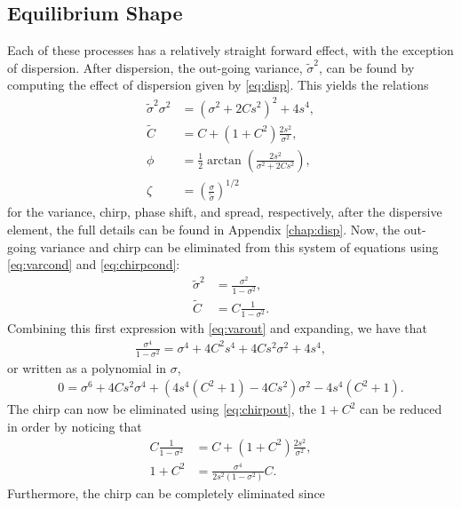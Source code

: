 \subsection{Equilibrium Shape}
Each of these processes has a relatively straight forward effect, with the exception of dispersion. After dispersion, the out-going variance, $\widetilde{\sigma}^2$, can be found by computing the effect of dispersion given by \eqref{eq:disp}. This yields the relations
\begin{subequations}
\begin{align}
\label{eq:varout}
\widetilde{\sigma}^2 \sigma^2 &= \left( \sigma^2 + 2 C s^2 \right)^2 + 4s^4, \\
\label{eq:chirpout}
\widetilde{C} &= C + (1+C^2) \frac{2 s^2}{\sigma^2}, \\
\label{eq:phase}
\phi &= \frac{1}{2} \arctan \left( \frac{2s^2}{\sigma^2 + 2C s^2} \right), \\
\zeta &= \left( \frac{\sigma}{\widetilde{\sigma}} \right)^{1/2}
\end{align}
\end{subequations}
for the variance, chirp, phase shift, and spread, respectively, after the dispersive element, the full details can be found in Appendix \ref{chap:disp}. Now, the out-going variance and chirp can be eliminated from this system of equations using \eqref{eq:varcond} and \eqref{eq:chirpcond}:
\begin{align*}
\widetilde{\sigma}^2 &= \frac{\sigma^2}{1 - \sigma^2}, \\
\widetilde{C} &= C \frac{1}{1 - \sigma^2}.
\end{align*}
Combining this first expression with \eqref{eq:varout} and expanding, we have that
\begin{align*}
\frac{\sigma^4}{1 - \sigma^2} = \sigma^4 + 4 C^2 s^4 + 4 C s^2 \sigma^2 + 4s^4,
\end{align*}
or written as a polynomial in $\sigma$,
\begin{align*}
0 = \sigma^6 + 4 C s^2 \sigma^4 + \left( 4s^4 (C^2 + 1) - 4 C s^2 \right) \sigma^2 - 4s^4 (C^2 + 1).
\end{align*}
The chirp can now be eliminated using \eqref{eq:chirpout}, the $1+C^2$ can be reduced in order by noticing that
\begin{align*}
C \frac{1}{1 - \sigma^2} &= C + (1 + C^2) \frac{2s^2}{\sigma^2}, \\
1 + C^2 &= \frac{\sigma^4}{2s^2(1 - \sigma^2)} C.
\end{align*}
Furthermore, the chirp can be completely eliminated since
